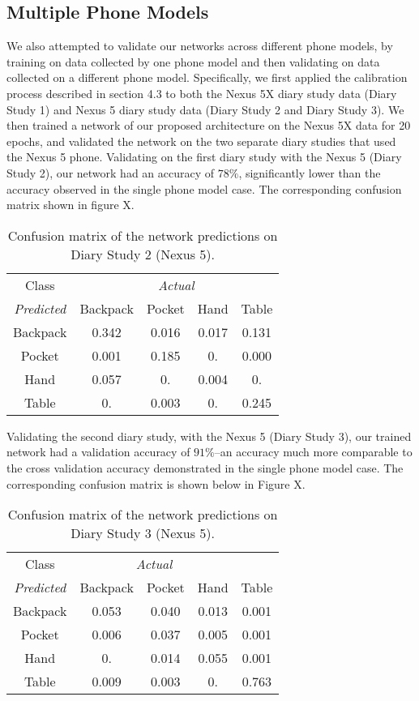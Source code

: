 \subsection{Multiple Phone Models}
We also attempted to validate our networks across different phone models, by training
on data collected by one phone model and then validating on data collected on a 
different phone model. Specifically, we first applied the calibration process described in section 4.3 
to both the Nexus 5X diary study data (Diary Study 1) and Nexus 5 diary study data (Diary Study 2 and Diary Study 3).
We then trained a network of our proposed architecture on the Nexus 5X data for 20 epochs, 
and validated the network on the two separate diary studies that used the
Nexus 5 phone.
Validating on the first diary study with the Nexus 5 (Diary Study 2), our network
had an accuracy of $78\%$, significantly lower than the accuracy observed
in the single phone model case. The corresponding confusion matrix shown in figure X.


\begin{table}[h]
\caption{Confusion matrix of the network predictions on Diary Study 2 (Nexus 5).}\label{fig:confusion}
\centering
\begin{tabular}{| c || c | c | c | c |}  
\toprule
Class & \multicolumn{4}{c}{\textit{Actual}} \\
\cmidrule{2-5}
\textit{Predicted}	&	Backpack    & 	Pocket 	& 	Hand	&	Table \\
\midrule
Backpack			&	0.342 	&	0.016	&	0.017 	&	0.131 \\
Pocket			&	0.001 	&	0.185 	&	0.	 	&	0.000 \\
Hand			&	0.057 	&	0.	 	&	0.004 	&	0. \\
Table			&	0. 		&	0.003 	&	0.	 	&	0.245\\
\bottomrule
\end{tabular}
\end{table}


Validating the second diary study, with the Nexus 5 (Diary Study 3), our trained network had a validation
accuracy of $91\%$--an accuracy much more comparable to the cross validation accuracy
demonstrated in the single phone model case. The corresponding confusion matrix is 
shown below in Figure X.

\begin{table}[h]
\caption{Confusion matrix of the network predictions on Diary Study 3 (Nexus 5).}\label{fig:confusion} \centering
\begin{tabular}{| c || c | c | c | c |}  
\toprule
Class & \multicolumn{3}{c}{\textit{Actual}} \\ 
\cmidrule{1-5}
\textit{Predicted}	&	Backpack    & 	Pocket 	& 	Hand	&	Table \\
\midrule
Backpack			&	0.053 	&	0.040	&	0.013 	&	0.001 \\
Pocket			&	0.006 	&	0.037 	&	0.005 	&	0.001 \\
Hand			&	0.	 	&	0.014 	&	0.055 	&	0.001 \\
Table			&	0.009 	&	0.003 	&	0.	 	&	0.763\\
\bottomrule
\end{tabular}
\end{table}


